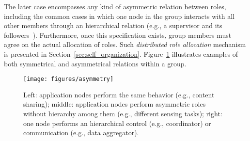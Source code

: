 
The later case encompasses any kind of asymmetric relation between roles, including the common cases in which one node in the group interacts with all other members through an hierarchical relation (e.g., a supervisor and its followers~\cite{Baresi:2011}). Furthermore, once this specification exists, group members must agree on the actual allocation of roles. Such \textit{distributed role allocation} mechanism is presented in Section~\ref{sec:self_organization}. Figure~\ref{fig:asymmetry} illustrates examples of both symmetrical and asymmetrical relations within a group. 

\begin{figure}[t!]
	\centering
	\texttt{[image: figures/asymmetry]}
	\caption{Left: application nodes perform the same behavior (e.g., content sharing); middle: application nodes perform asymmetric roles without hierarchy among them (e.g., different sensing tasks); right: one node performs an hierarchical control (e.g., coordinator) or communication (e.g., data aggregator).}
	\label{fig:asymmetry}
\end{figure}








